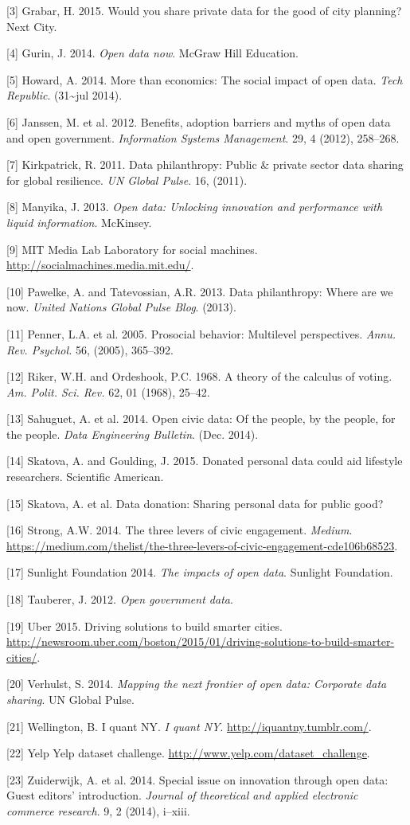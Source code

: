 \documentclass[]{acm_proc_article-sp}
\begin{document}
{[}3{]} Grabar, H. 2015. Would you share private data for the good of
city planning? Next City.

{[}4{]} Gurin, J. 2014. \emph{Open data now}. McGraw Hill Education.

{[}5{]} Howard, A. 2014. More than economics: The social impact of open
data. \emph{Tech Republic}. (31\textasciitilde{}jul 2014).

{[}6{]} Janssen, M. et al. 2012. Benefits, adoption barriers and myths
of open data and open government. \emph{Information Systems Management}.
29, 4 (2012), 258--268.

{[}7{]} Kirkpatrick, R. 2011. Data philanthropy: Public \& private
sector data sharing for global resilience. \emph{UN Global Pulse}. 16,
(2011).

{[}8{]} Manyika, J. 2013. \emph{Open data: Unlocking innovation and
performance with liquid information}. McKinsey.

{[}9{]} MIT Media Lab Laboratory for social machines.
\url{http://socialmachines.media.mit.edu/}.

{[}10{]} Pawelke, A. and Tatevossian, A.R. 2013. Data philanthropy:
Where are we now. \emph{United Nations Global Pulse Blog}. (2013).

{[}11{]} Penner, L.A. et al. 2005. Prosocial behavior: Multilevel
perspectives. \emph{Annu. Rev. Psychol.} 56, (2005), 365--392.

{[}12{]} Riker, W.H. and Ordeshook, P.C. 1968. A theory of the calculus
of voting. \emph{Am. Polit. Sci. Rev.} 62, 01 (1968), 25--42.

{[}13{]} Sahuguet, A. et al. 2014. Open civic data: Of the people, by
the people, for the people. \emph{Data Engineering Bulletin}. (Dec.
2014).

{[}14{]} Skatova, A. and Goulding, J. 2015. Donated personal data could
aid lifestyle researchers. Scientific American.

{[}15{]} Skatova, A. et al. Data donation: Sharing personal data for
public good?

{[}16{]} Strong, A.W. 2014. The three levers of civic engagement.
\emph{Medium}.
\url{https://medium.com/thelist/the-three-levers-of-civic-engagement-cde106b68523}.

{[}17{]} Sunlight Foundation 2014. \emph{The impacts of open data}.
Sunlight Foundation.

{[}18{]} Tauberer, J. 2012. \emph{Open government data}.

{[}19{]} Uber 2015. Driving solutions to build smarter cities.
\url{http://newsroom.uber.com/boston/2015/01/driving-solutions-to-build-smarter-cities/}.

{[}20{]} Verhulst, S. 2014. \emph{Mapping the next frontier of open
data: Corporate data sharing}. UN Global Pulse.

{[}21{]} Wellington, B. I quant NY. \emph{I quant NY}.
\url{http://iquantny.tumblr.com/}.

{[}22{]} Yelp Yelp dataset challenge.
\url{http://www.yelp.com/dataset_challenge}.

{[}23{]} Zuiderwijk, A. et al. 2014. Special issue on innovation through
open data: Guest editors' introduction. \emph{Journal of theoretical and
applied electronic commerce research}. 9, 2 (2014), i--xiii.
\end{document}
